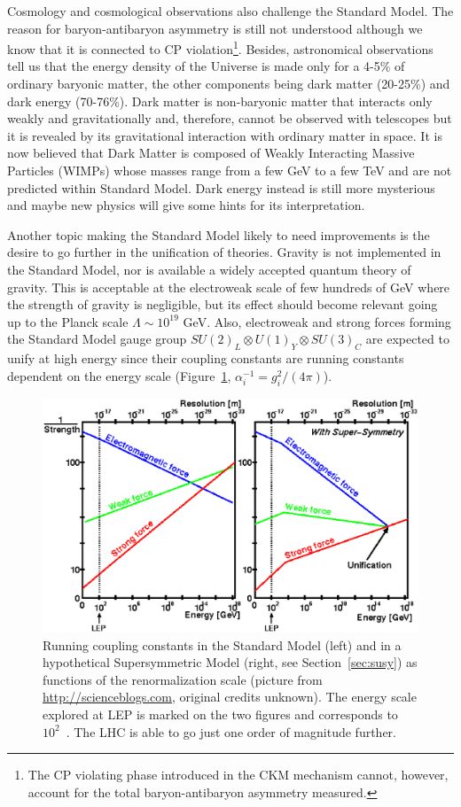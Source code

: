 Cosmology and cosmological observations also challenge 
the Standard Model. The reason for baryon-antibaryon 
asymmetry is still not understood although we know 
that it is connected to  CP violation\footnote{The CP violating 
phase introduced in the CKM mechanism cannot, however, 
account for the total baryon-antibaryon asymmetry measured.}. 
Besides, astronomical observations~\cite{Ade:2013zuv} 
tell us that the energy density of the 
Universe is made only for a 4-5\% of ordinary baryonic 
matter, the other components being dark matter (20-25\%) 
and dark energy (70-76\%). Dark matter is non-baryonic 
matter that interacts only weakly and gravitationally and,
therefore, cannot be observed with telescopes but it
is revealed by its gravitational interaction with ordinary 
matter in space. 
It is now believed that Dark Matter is composed  of 
Weakly Interacting Massive Particles (WIMPs) whose 
masses range from a few GeV to a few TeV and  are 
not predicted within Standard Model. Dark energy instead is 
still more mysterious and maybe new physics will 
give some hints for its interpretation.

Another topic making the Standard Model likely to 
need improvements is the desire to go further in 
the unification of theories. Gravity is not 
implemented in the Standard Model, nor is available
a widely accepted quantum theory of gravity.
This is acceptable at the electroweak scale of 
few hundreds of GeV where the strength of gravity
is negligible, but its effect should become relevant 
going up to the Planck scale $\Lambda \sim 10^{19}$ GeV. 
Also, electroweak and strong forces forming the Standard 
Model gauge group $SU(2)_{L}\otimes U(1)_{Y}\otimes SU(3)_{C}$ 
are expected to unify at high energy since their coupling 
constants are running constants dependent on the energy 
scale (Figure~\ref{running}, $\alpha^{-1}_{i} = g^{2}_{i}/(4\pi)$). 
\begin{figure}[htb]\begin{center}
\includegraphics[width=.8\textwidth]{theory/figures/running_coupling}
\caption{Running coupling constants in the Standard Model (left) and 
in a hypothetical Supersymmetric Model (right, see Section~\ref{sec:susy}) 
as functions of the renormalization scale (picture from \url{http://scienceblogs.com},
original credits unknown). The energy scale explored at LEP is marked
on the two figures and corresponds to $10^2$~\gev. The LHC is able to
go just one order of magnitude further.}
\label{running}\end{center}\end{figure}

